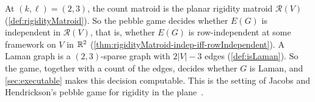 At $(k, \ell) = (2, 3)$, the count matroid is the planar rigidity
matroid $\mathcal{R}(V)$ (\cref{def:rigidityMatroid}). So the pebble
game decides whether $E(G)$ is independent in $\mathcal{R}(V)$, that
is, whether $E(G)$ is row-independent at some framework on $V$ in
${\mathbb{R}}^{2}$ (\cref{thm:rigidityMatroid-indep-iff-rowIndependent}). A Laman
graph is a $(2, 3)$-sparse graph with $2|V| - 3$ edges
(\cref{def:isLaman}). So the game, together with a count of the edges,
decides whether $G$ is Laman, and \cref{sec:executable} makes this
decision computable. This is the setting of Jacobs and Hendrickson's
pebble game for rigidity in the plane~\cite{jacobsHendrickson1997}.

